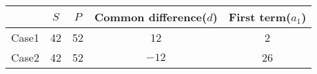 \begin{tabular}{|c|c|c|c|c|}

\hline
\textbf{} &\textbf{$S$} &\textbf{$P$}&\textbf{Common difference($d$)} &\textbf{First term($a_1$)} \\
\hline
Case1 & 42 & 52 & 12 & 2\\
\hline
Case2 &42 & 52 & $-12$ & 26\\
\hline

\end{tabular}
